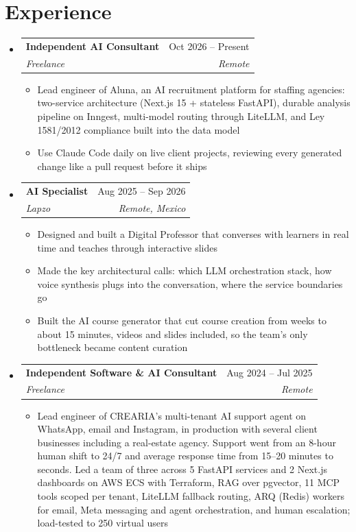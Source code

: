 \documentclass[letterpaper,10pt]{article}
\makeatletter
\newcommand{\resumeSubheading}[4]{
  \vspace{-2pt}
  \item[]
  \begin{tabular*}{\textwidth}{@{\extracolsep{\fill}}l r}
    \textbf{#1} & #2 \\
    \textit{#3} & \textit{#4} \\
  \end{tabular*}
  \vspace{-5pt}
}
\makeatother
\begin{document}
\section{Experience}
\begin{itemize}[leftmargin=0pt, itemindent=0pt, label={}, itemsep=1pt]
\resumeSubheading
{Independent AI Consultant}{Oct 2026 -- Present}
{Freelance}{Remote}
\begin{itemize}[leftmargin=*, itemsep=0pt]
    \item Lead engineer of Aluna, an AI recruitment platform for staffing agencies: two-service architecture (Next.js 15 + stateless FastAPI), durable analysis pipeline on Inngest, multi-model routing through LiteLLM, and Ley 1581/2012 compliance built into the data model
    \item Use Claude Code daily on live client projects, reviewing every generated change like a pull request before it ships
\end{itemize}
\resumeSubheading
{AI Specialist}{Aug 2025 -- Sep 2026}
{Lapzo}{Remote, Mexico}
\begin{itemize}[leftmargin=*, itemsep=0pt]
    \item Designed and built a Digital Professor that converses with learners in real time and teaches through interactive slides
    \item Made the key architectural calls: which LLM orchestration stack, how voice synthesis plugs into the conversation, where the service boundaries go
    \item Built the AI course generator that cut course creation from weeks to about 15 minutes, videos and slides included, so the team's only bottleneck became content curation
\end{itemize}
\resumeSubheading
{Independent Software \& AI Consultant}{Aug 2024 -- Jul 2025}
{Freelance}{Remote}
\begin{itemize}[leftmargin=*, itemsep=0pt]
    \item Lead engineer of CREARIA's multi-tenant AI support agent on WhatsApp, email and Instagram, in production with several client businesses including a real-estate agency. Support went from an 8-hour human shift to 24/7 and average response time from 15--20 minutes to seconds. Led a team of three across 5 FastAPI services and 2 Next.js dashboards on AWS ECS with Terraform, RAG over pgvector, 11 MCP tools scoped per tenant, LiteLLM fallback routing, ARQ (Redis) workers for email, Meta messaging and agent orchestration, and human escalation; load-tested to 250 virtual users

\end{itemize}
\end{itemize}
\end{document}
